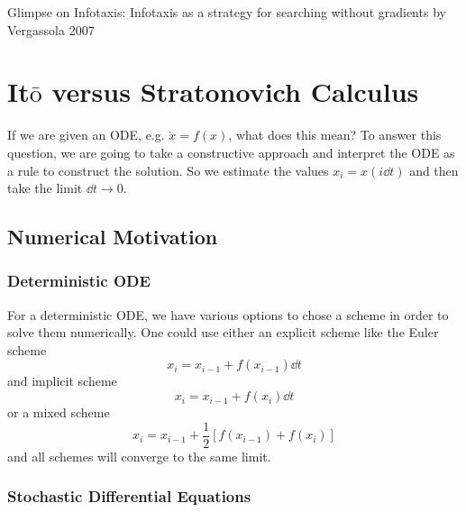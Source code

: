 \documentclass{notebook}
\begin{document}
Glimpse on Infotaxis: Infotaxis as a strategy for searching without gradients by Vergassola 2007


\chapter{It$\bar{\mathrm{o}}$ versus Stratonovich Calculus}
\label{chap:7}

If we are given an ODE, e.g. $\dot{x} = f(x)$, what does this mean? To answer this question, we are going to take a constructive approach and interpret the ODE as a rule to construct the solution. So we estimate the values $x_i = x(i \dd{t})$ and then take the limit $\dd{t} \to 0$.

\section{Numerical Motivation}

\subsection*{Deterministic ODE} 

For a deterministic ODE, we have various options to chose a scheme in order to solve them numerically. One could use either an explicit scheme like the Euler scheme 
%
\begin{equation}
	x_i = x_{i-1} + f(x_{i-1}) \dd{t}
\end{equation}
%
and implicit scheme 
%
\begin{equation}
	x_i = x_{i-1} + f(x_i) \dd{t}
\end{equation}
%
or a mixed scheme
%
\begin{equation}
	x_i = x_{i-1} + \frac{1}{2} [f(x_{i-1}) + f(x_i)]
\end{equation}
%
and all schemes will converge to the same limit.

\subsection*{Stochastic Differential Equations} 
\end{document}

